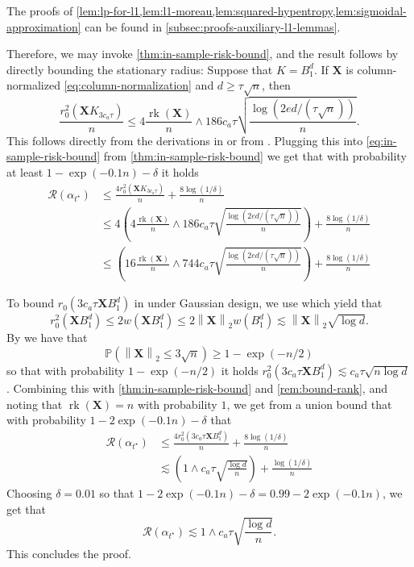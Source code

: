 \documentclass[a4paper]{article}
\newcommand{\pr}[1]{\left(#1\right)}
\newcommand{\norm}[1]{\left\|#1\right\|}
\newcommand{\X}[0]{\mathbf{X}}
\newcommand{\PP}[0]{\mathbb{P}}
\newcommand{\cR}[0]{\mathcal{R}}
\newcommand{\alphatstar}[0]{\alpha_{t^\star}}
\newcommand{\rzero}[0]{r_{0}}
\DeclareMathOperator{\rankOp}{rk}
\newcommand{\rank}[1]{\rankOp\pr{#1}}
\theoremstyle{thmstyle}
\theoremstyle{defstyle}
\theoremstyle{remark}
\begin{document}
The proofs of \cref{lem:lp-for-l1,lem:l1-moreau,lem:squared-hypentropy,lem:sigmoidal-approximation} can be found in \cref{subsec:proofs-auxiliary-l1-lemmas}.

    Therefore, we may invoke \cref{thm:in-sample-risk-bound}, and the result follows by directly bounding the stationary radius:
    Suppose that $K=B_1^d$. If $\X$ is column-normalized \eqref{eq:column-normalization} and $d\geq \tau \sqrt{n}$, then
    \begin{equation*}
        \frac{\rzero^2(\X K_{3c_a\tau })}{n} \leq 4\frac{\rank{\X}}{n} \wedge 186c_a\tau\sqrt{\frac{\log (2ed/(\tau\sqrt{n}))}{n}}.
    \end{equation*}
    This follows directly from the derivations in \cite[Theorem 7]{Bellec2017localizedgaussianwidthmconvex} or from \cite{Gordon2007}.  
    Plugging this into \eqref{eq:in-sample-risk-bound} from \cref{thm:in-sample-risk-bound} we get that with probability at least $1-\exp(-0.1n)-\delta$ it holds
    \begin{align*}
        \cR(\alphatstar) &\leq \frac{4\rzero^2(\X K_{3c_a\tau})}{n}+\frac{8\log(1/\delta)}{n} \\
        &\leq  4\pr{4\frac{\rank{\X}}{n} \wedge 186c_a\tau\sqrt{\frac{\log (2ed/(\tau\sqrt{n}))}{n}}} + \frac{8\log(1/\delta)}{n} \\
        &\leq  \pr{16\frac{\rank{\X}}{n} \wedge 744c_a\tau\sqrt{\frac{\log (2ed/(\tau\sqrt{n}))}{n}}} + \frac{8\log(1/\delta)}{n}
    \end{align*}

    To bound $\rzero(3c_a\tau \X B_1^d)$ in under Gaussian design,
    we use \cite[Examples 7.5.4 and 7.5.11]{Vershynin2018}
    which yield that 
    \begin{equation*}
        \rzero^2(\X B_1^d)\leq 2 w(\X B_1^d)\leq 2\norm{\X}_2 w(B_1^d) \lesssim \norm{\X}_2 \sqrt{\log d}.
    \end{equation*}
    By \cite[Theorem 6.1]{Wainwright2019} we have that
    \begin{equation*}
        \PP\pr{\norm{\X}_2 \leq 3\sqrt{n} } \geq 1-\exp\pr{-n/2}
    \end{equation*}
    so that with probability $1-\exp(-n/2)$ it holds $\rzero^2(3c_a\tau \X B_1^d)\lesssim c_a\tau \sqrt{n\log d}$.
    Combining this with \cref{thm:in-sample-risk-bound} and \cref{rem:bound-rank}, and noting that $\rank{\X}=n$ with probability $1$, we get from a union bound that with probability $1-2\exp\pr{-0.1n}-\delta$ that
    \begin{align*}
        \cR(\alphatstar) &\leq \frac{4\rzero^2( 3c_a\tau\X B_1^d)}{n}+\frac{8\log(1/\delta)}{n} \\
        &\lesssim \pr{1\wedge c_a\tau \sqrt{\frac{\log d}{n}}}+\frac{\log(1/\delta)}{n}
    \end{align*}
    Choosing $\delta = 0.01$ so that $1-2\exp\pr{-0.1n}-\delta = 0.99-2\exp\pr{-0.1n}$, we get that
    \begin{equation*}
        \cR(\alphatstar)\lesssim 1\wedge c_a\tau\sqrt{\frac{\log d}{n}}.
    \end{equation*}
    This concludes the proof.
\end{document}
